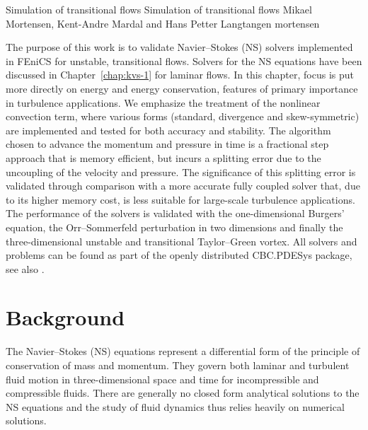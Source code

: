 \renewcommand{\vec}[1]{\ensuremath{{#1}}}
\newcommand{\Nset}{\ensuremath{\mathbb{N}}\xspace}
\newcommand{\Zset}{\ensuremath{\mathbb{Z}}\xspace}
\newcommand{\Qset}{\ensuremath{\mathbb{Q}}\xspace}
\newcommand{\Cset}{\ensuremath{\mathbb{C}}\xspace}
\newcommand{\Hdivnull}{\ensuremath{Z}}

              {Simulation of transitional flows}
              {Simulation of transitional flows}
              {Mikael Mortensen, Kent-Andre Mardal and Hans Petter Langtangen}
              {mortensen}


The purpose of this work is to validate Navier--Stokes (NS) solvers
implemented in FEniCS for unstable, transitional flows. Solvers for
the NS equations have been discussed in Chapter~\ref{chap:kvs-1} for
laminar flows. In this chapter, focus is put more directly on energy
and energy conservation, features of primary importance in turbulence
applications. We emphasize the treatment of the nonlinear convection
term, where various forms (standard, divergence and skew-symmetric) are
implemented and tested for both accuracy and stability. The algorithm
chosen to advance the momentum and pressure in time is a fractional
step approach that is memory efficient, but incurs a splitting error
due to the uncoupling of the velocity and pressure. The significance
of this splitting error is validated through comparison with a more
accurate fully coupled solver that, due to its higher memory cost, is
less suitable for large-scale turbulence applications. The performance
of the solvers is validated with the one-dimensional Burgers' equation,
the Orr--Sommerfeld perturbation in two dimensions and finally the
three-dimensional unstable and transitional Taylor--Green vortex.
All solvers and problems can be found as part of the openly
distributed CBC.PDESys package, see also \cite{Mortensen2011}.

\section{Background}

The Navier--Stokes (NS) equations represent a differential form of the
principle of conservation of mass and momentum. They govern both laminar
and turbulent fluid motion in three-dimensional space and time for
incompressible and compressible fluids. There are generally no closed
form analytical solutions to the NS equations and the study of fluid
dynamics thus relies heavily on numerical solutions.

